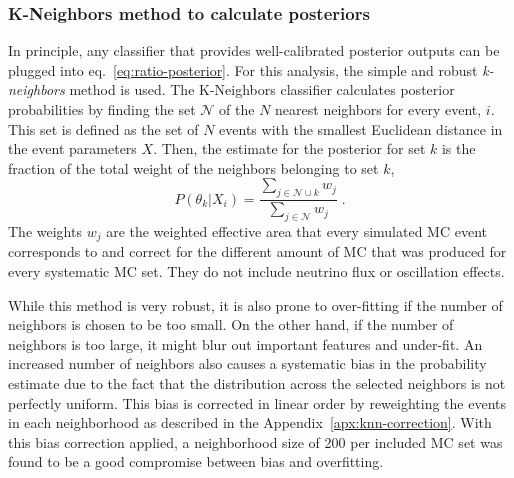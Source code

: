 \subsubsection{K-Neighbors method to calculate posteriors}
In principle, any classifier that provides well-calibrated posterior outputs can be plugged into eq.~\ref{eq:ratio-posterior}. For this analysis, the simple and robust \emph{k-neighbors} method is used.
The K-Neighbors classifier calculates posterior probabilities by finding the set $\mathcal{N}$ of the $N$ nearest neighbors for every event, $i$. This set is defined as the set of $N$ events with the smallest Euclidean distance in the event parameters $X$.  Then, the estimate for the posterior for set $k$ is the fraction of the total weight of the neighbors belonging to set $k$,
\begin{equation}
    P(\theta_k|X_i) = \frac{\sum_{j\in{\mathcal{N}\cup k}} w_j }{\sum_{j\in{\mathcal{N}}} w_j}\;. \label{eq:posterior-knn}
\end{equation}
The weights $w_j$ are the weighted effective area that every simulated MC event corresponds to and correct for the different amount of MC that was produced for every systematic MC set. They do not include neutrino flux or oscillation effects.

While this method is very robust, it is also prone to over-fitting if the number of neighbors is chosen to be too small. On the other hand, if the number of neighbors is too large, it might blur out important features and under-fit. An increased number of neighbors also causes a systematic bias in the probability estimate due to the fact that the distribution across the selected neighbors is not perfectly uniform. This bias is corrected in linear order by reweighting the events in each neighborhood as described in the Appendix~\ref{apx:knn-correction}. With this bias correction applied, a neighborhood size of 200 per included MC set was found to be a good compromise between bias and overfitting.

